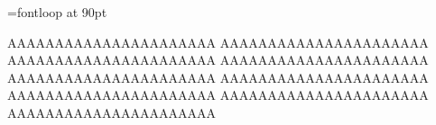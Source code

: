 \documentclass[a4paper]{report}
\begin{document}
\pagestyle{empty}
\scriptsize

\noindent
\font\big=fontloop at 90pt     %
\noindent
\big  
 \begin{flushleft}

AAAAAAAAAAAAAAAAAAAAAA
AAAAAAAAAAAAAAAAAAAAAA
AAAAAAAAAAAAAAAAAAAAAA
AAAAAAAAAAAAAAAAAAAAAA
AAAAAAAAAAAAAAAAAAAAAA
AAAAAAAAAAAAAAAAAAAAAA
AAAAAAAAAAAAAAAAAAAAAA
AAAAAAAAAAAAAAAAAAAAAA
AAAAAAAAAAAAAAAAAAAAAA


\end{flushleft}
\end{document}
